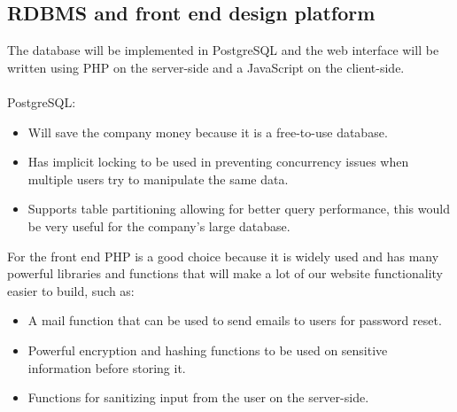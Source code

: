 \documentclass{project}
\begin{document}
\subsection{RDBMS and front end design platform}
The database will be implemented in PostgreSQL and the web interface will be written using PHP on the server-side and a JavaScript on the client-side.
\\\\
PostgreSQL:
\begin{itemize}
\item Will save the company money because it is a free-to-use database.
\item Has implicit locking to be used in preventing concurrency issues when multiple users try to manipulate the same data.
\item Supports table partitioning allowing for better query performance, this would be very useful for the company's large database.
\end{itemize}
For the front end PHP is a good choice because it is widely used and has many powerful libraries and functions that will make a lot of our website functionality easier to build, such as:
\begin{itemize}
\item A mail function that can be used to send emails to users for password reset.
\item Powerful encryption and hashing functions to be used on sensitive information before storing it.
\item Functions for sanitizing input from the user on the server-side. 
\end{itemize}
\end{document}
